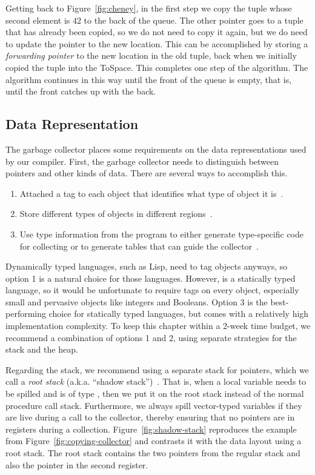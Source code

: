 \documentclass[11pt]{book}
\begin{document}
Getting back to Figure~\ref{fig:cheney}, in the first step we copy the
tuple whose second element is $42$ to the back of the queue. The other
pointer goes to a tuple that has already been copied, so we do not
need to copy it again, but we do need to update the pointer to the new
location. This can be accomplished by storing a \emph{forwarding
pointer} to the new location in the old tuple, back when we initially
copied the tuple into the ToSpace. This completes one step of the
algorithm. The algorithm continues in this way until the front of the
queue is empty, that is, until the front catches up with the back.


\subsection{Data Representation}
\label{sec:data-rep-gc}

The garbage collector places some requirements on the data
representations used by our compiler. First, the garbage collector
needs to distinguish between pointers and other kinds of data. There
are several ways to accomplish this.
\begin{enumerate}
\item Attached a tag to each object that identifies what type of
  object it is~\citep{McCarthy:1960dz}.
\item Store different types of objects in different
  regions~\citep{Steele:1977ab}.
\item Use type information from the program to either generate
  type-specific code for collecting or to generate tables that can
  guide the
  collector~\citep{Appel:1989aa,Goldberg:1991aa,Diwan:1992aa}.
\end{enumerate}
Dynamically typed languages, such as Lisp, need to tag objects
anyways, so option 1 is a natural choice for those languages.
However, \LangVec{} is a statically typed language, so it would be
unfortunate to require tags on every object, especially small and
pervasive objects like integers and Booleans.  Option 3 is the
best-performing choice for statically typed languages, but comes with
a relatively high implementation complexity. To keep this chapter
within a 2-week time budget, we recommend a combination of options 1
and 2, using separate strategies for the stack and the heap.

Regarding the stack, we recommend using a separate stack for pointers,
which we call a \emph{root stack} (a.k.a. ``shadow
stack'')~\citep{Siebert:2001aa,Henderson:2002aa,Baker:2009aa}. That
is, when a local variable needs to be spilled and is of type
, then we put it on the root
stack instead of the normal procedure call stack. Furthermore, we
always spill vector-typed variables if they are live during a call to
the collector, thereby ensuring that no pointers are in registers
during a collection. Figure~\ref{fig:shadow-stack} reproduces the
example from Figure~\ref{fig:copying-collector} and contrasts it with
the data layout using a root stack. The root stack contains the two
pointers from the regular stack and also the pointer in the second
register.
\end{document}
